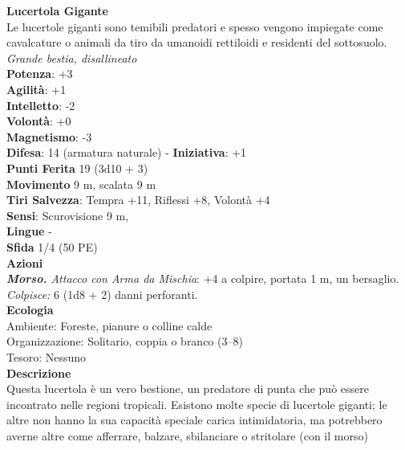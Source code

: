 \begin{multicols}{2}
\medskip\textbf{Lucertola Gigante}\\
Le lucertole giganti sono temibili predatori e spesso vengono impiegate come cavalcature o animali da tiro da umanoidi rettiloidi e residenti del sottosuolo.\\
\emph{Grande bestia, disallineato} \\
\textbf{Potenza}: +3\\
\textbf{Agilità}: +1\\
\textbf{Intelletto}: -2\\
\textbf{Volontà}: +0\\
\textbf{Magnetismo}: -3\\
\textbf{Difesa}: 14 (armatura naturale) - \textbf{Iniziativa}: +1\\
\textbf{Punti Ferita} 19 (3d10 + 3)\\
\textbf{Movimento} 9 m, scalata 9 m\\
\textbf{Tiri Salvezza}: Tempra +11, Riflessi +8, Volontà +4 \\
\textbf{Sensi}: Scurovisione 9 m, \\
\textbf{Lingue} -\\
\textbf{Sfida} 1/4 (50 PE)\smallskip\\
\smallskip\textbf{Azioni}\\
\emph{\textbf{Morso.} Attacco con Arma da Mischia}: +4 a colpire, portata 1 m, un bersaglio.\\
\emph{Colpisce:} 6 (1d8 + 2) danni perforanti.\\
\textbf{Ecologia}\\
Ambiente: Foreste, pianure o colline calde\\
Organizzazione: Solitario, coppia o branco (3–8)\\
Tesoro: Nessuno\\
\textbf{Descrizione}\\

Questa lucertola è un vero bestione, un predatore di punta che può essere incontrato nelle regioni tropicali. Esistono molte specie di lucertole giganti; le altre non hanno la sua capacità speciale carica intimidatoria, ma potrebbero averne altre come afferrare, balzare, sbilanciare o stritolare (con il morso)\\


\end{multicols}
